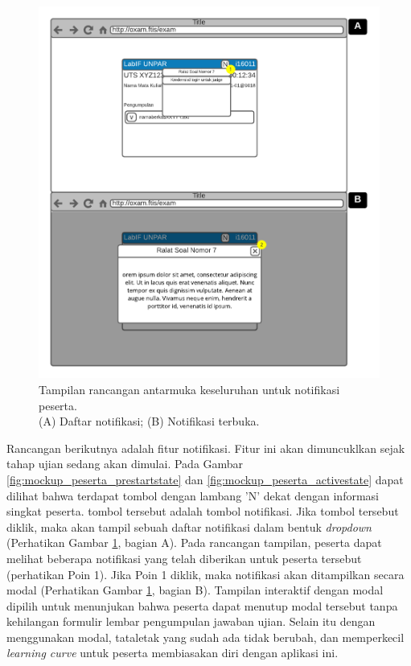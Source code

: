     \begin{figure}
        \centering
        \includegraphics[width=0.7\paperwidth]{Gambar/mockups/Mockup--Peserta - Notif.pdf}
        \caption{Tampilan rancangan antarmuka keseluruhan untuk notifikasi
        peserta. \\
            (A) Daftar notifikasi; (B) Notifikasi terbuka.}
        \label{fig:mockup_peserta_notif}
    \end{figure}
    Rancangan berikutnya adalah fitur notifikasi. Fitur ini akan dimuncuklkan
    sejak tahap ujian sedang akan dimulai. Pada Gambar
    \ref{fig:mockup_peserta_prestartstate} dan
    \ref{fig:mockup_peserta_activestate} dapat dilihat bahwa terdapat tombol
    dengan lambang 'N' dekat dengan informasi singkat peserta. tombol tersebut
    adalah tombol notifikasi. Jika tombol tersebut diklik, maka akan tampil
    sebuah daftar notifikasi dalam bentuk \textit{dropdown} (Perhatikan Gambar
    \ref{fig:mockup_peserta_notif}, bagian A). Pada rancangan tampilan, peserta
    dapat melihat beberapa notifikasi yang telah diberikan untuk peserta
    tersebut (perhatikan Poin 1). Jika Poin 1 diklik, maka notifikasi akan
    ditampilkan secara modal (Perhatikan Gambar \ref{fig:mockup_peserta_notif},
    bagian B). Tampilan interaktif dengan modal dipilih untuk menunjukan bahwa
    peserta dapat menutup modal tersebut tanpa kehilangan formulir lembar
    pengumpulan jawaban ujian. Selain itu dengan menggunakan modal, tataletak
    yang sudah ada tidak berubah, dan memperkecil \textit{learning curve} untuk
    peserta membiasakan diri dengan aplikasi ini.
    
